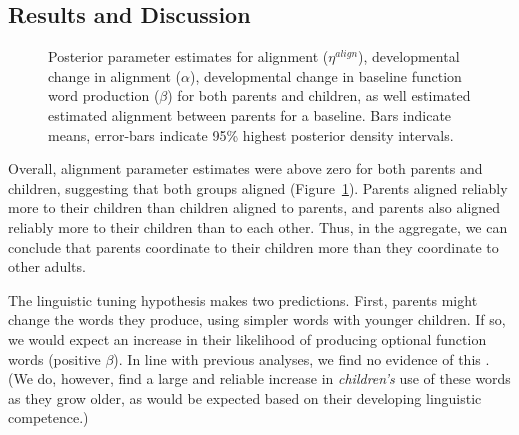 \documentclass[10pt,letterpaper]{article}
\begin{document}
\subsection{Results and Discussion}

\begin{figure}[tb]
  \caption{\label{fig:model_parameters} Posterior parameter estimates for alignment ($\eta^{align}$), developmental change in alignment ($\alpha$), developmental change in baseline function word production ($\beta$) for both parents and children, as well estimated estimated alignment between parents for a baseline. Bars indicate means, error-bars indicate  95\% highest posterior density intervals.}
\end{figure}


Overall, alignment parameter estimates were above zero for both parents and children, suggesting that both groups aligned (Figure~\ref{fig:model_parameters}). Parents aligned reliably more to their children than children aligned to parents, and parents also aligned reliably more to their children than to each other. Thus, in the aggregate, we can conclude that parents coordinate to their children more than they coordinate to other adults.

The linguistic tuning hypothesis makes two predictions. First, parents might change the words they produce, using simpler words with younger children. If so, we would expect an increase in their likelihood of producing optional function words (positive $\beta$). In line with previous analyses, we find no evidence of this \cite{newport1977, hayes1988}. (We do, however, find a large and reliable increase in \emph{children's} use of these words as they grow older, as would be expected based on their developing linguistic competence.)
\end{document}
